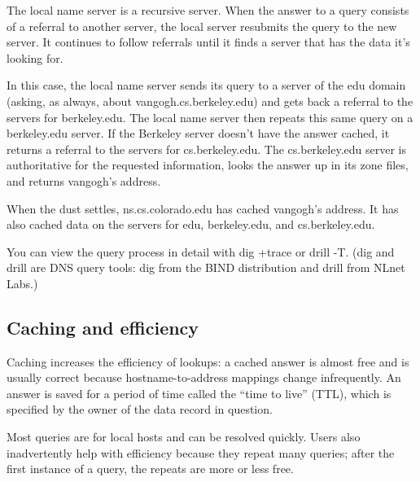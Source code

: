 The local name server is a recursive server. When the answer to a query
consists of a referral to another server, the local server resubmits the
query to the new server. It continues to follow referrals until it finds
a server that has the data it's looking for.

In this case, the local name server sends its query to a server of the
edu domain (asking, as always, about vangogh.cs.berkeley.edu) and gets
back a referral to the servers for berkeley.edu. The local name server
then repeats this same query on a berkeley.edu server. If the Berkeley
server doesn't have the answer cached, it returns a referral to the
servers for cs.berkeley.edu. The cs.berkeley.edu server is authoritative
for the requested information, looks the answer up in its zone files,
and returns vangogh's address.

When the dust settles, ns.cs.colorado.edu has cached vangogh's address.
It has also cached data on the servers for edu, berkeley.edu, and
cs.berkeley.edu.

You can view the query process in detail with {dig +trace} or {drill
-T}. ({dig} and {drill} are DNS query tools: {dig} from the BIND
distribution and {drill} from NLnet Labs.)

\protect\hypertarget{part0024_split_016.html}{}{}

\hypertarget{part0024_split_016.htmlux5cux23_idContainer1069}{}
\hypertarget{part0024_split_016.htmlux5cux23calibre_pb_15}{%
\subsection[Caching and
efficiency]{\texorpdfstring{\protect\hypertarget{part0024_split_016.htmlux5cux23_idTextAnchor861}{}{}Caching
and
efficiency}{Caching and efficiency}}\label{part0024_split_016.htmlux5cux23calibre_pb_15}}

\protect\hypertarget{part0024_split_016.htmlux5cux23_idIndexMarker2038}{}{}\protect\hypertarget{part0024_split_016.htmlux5cux23_idIndexMarker2039}{}{}Caching
increases the efficiency of lookups: a cached answer is almost free and
is usually correct because hostname-to-address mappings change
infrequently. An answer is saved for a period of time called the
``\protect\hypertarget{part0024_split_016.htmlux5cux23_idIndexMarker2040}{}{}\protect\hypertarget{part0024_split_016.htmlux5cux23_idIndexMarker2041}{}{}time
to live'' (TTL), which is specified by the owner of the data record in
question.

Most queries are for local hosts and can be resolved quickly. Users also
inadvertently help with efficiency because they repeat many queries;
after the first instance of a query, the repeats are more or less free.

